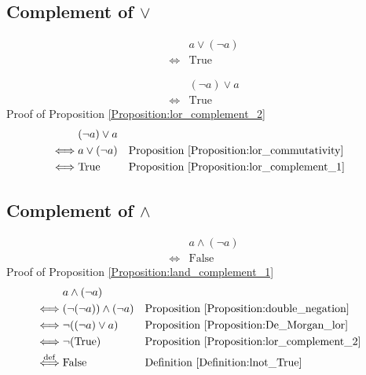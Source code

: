 \subsection{Complement of $\lor$}
\begin{prop}
\label{Proposition:lor_complement_1}
\begin{align*}
& a \lor (\lnot a) \\
\iff & \text{True}
\end{align*}
\end{prop}

\begin{prop}
\label{Proposition:lor_complement_2}
\begin{align*}
& (\lnot a) \lor a \\
\iff & \text{True}
\end{align*}
Proof of Proposition \ref{Proposition:lor_complement_2}
\begin{align*}
& (\lnot a) \lor a \\
\iff & a \lor (\lnot a)
& & \text{Proposition \ref{Proposition:lor_commutativity}} \\
\iff & \text{True}
& & \text{Proposition \ref{Proposition:lor_complement_1}} \\
\end{align*}
\end{prop}

\subsection{Complement of $\land$}
\begin{prop}
\label{Proposition:land_complement_1}
\begin{align*}
& a \land (\lnot a) \\
\iff & \text{False}
\end{align*}
Proof of Proposition \ref{Proposition:land_complement_1}
\begin{align*}
& a \land (\lnot a) \\
\iff & (\lnot (\lnot a)) \land (\lnot a)
& & \text{Proposition \ref{Proposition:double_negation}} \\
\iff & \lnot ((\lnot a) \lor a)
& & \text{Proposition \ref{Proposition:De_Morgan_lor}} \\
\iff & \lnot (\text{True})
& & \text{Proposition \ref{Proposition:lor_complement_2}} \\
\overset{\operatorname{def}}{\iff} & \text{False}
& & \text{Definition \ref{Definition:lnot_True}} \\
\end{align*}
\end{prop}

